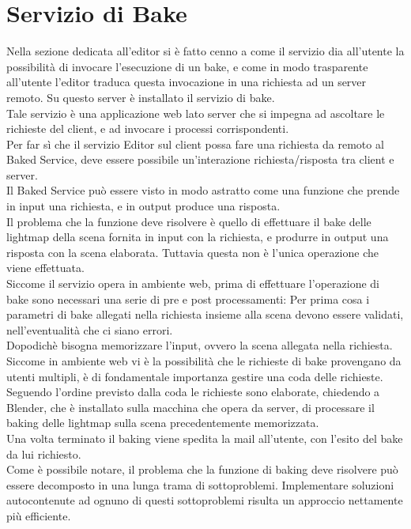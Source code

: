 \section{Servizio di Bake}
\label{sec:chapter_architettura_sistema_il_servizio_baking}

Nella sezione dedicata all’editor si è fatto cenno a come il servizio dia all’utente la possibilità di invocare l’esecuzione di un bake, e come in modo trasparente all’utente l’editor traduca questa invocazione in una richiesta ad un server remoto. Su questo server è installato il servizio di bake. 
\\
Tale servizio è una applicazione web lato server che si impegna ad ascoltare le richieste del client, e ad invocare i processi corrispondenti. 
\\
Per far sì che il servizio Editor sul client possa fare una richiesta da remoto al Baked Service, deve essere possibile un’interazione richiesta/risposta tra client e server.
\\ 
Il Baked Service può essere visto in modo astratto come una funzione che prende in input una richiesta, e in output produce una risposta.
\\ 
Il problema che la funzione deve risolvere è quello di effettuare il bake delle lightmap della scena fornita in input con la richiesta, e produrre in output una risposta con la scena elaborata. Tuttavia questa non è l’unica operazione che viene effettuata. 
\\
Siccome il servizio opera in ambiente web, prima di effettuare l’operazione di bake sono necessari una serie di pre e post processamenti:
Per prima cosa i parametri di bake allegati nella richiesta insieme alla scena devono essere validati, nell’eventualità che ci siano errori. 
\\
Dopodichè bisogna memorizzare l’input, ovvero la scena allegata nella richiesta.
\\ 
Siccome in ambiente web vi è la possibilità che le richieste di bake provengano da utenti multipli, è di fondamentale importanza gestire una coda delle richieste. Seguendo l’ordine previsto dalla coda le richieste sono elaborate, chiedendo a Blender, che è installato sulla macchina che opera da server, di processare il baking delle lightmap sulla scena precedentemente memorizzata.
\\ 
Una volta terminato il baking viene spedita la mail all’utente, con l’esito del bake da lui richiesto. 
\\
Come è possibile notare, il problema che la funzione di baking deve risolvere può essere decomposto in una lunga trama di sottoproblemi. Implementare soluzioni autocontenute ad ognuno di questi sottoproblemi risulta un approccio nettamente più efficiente.
